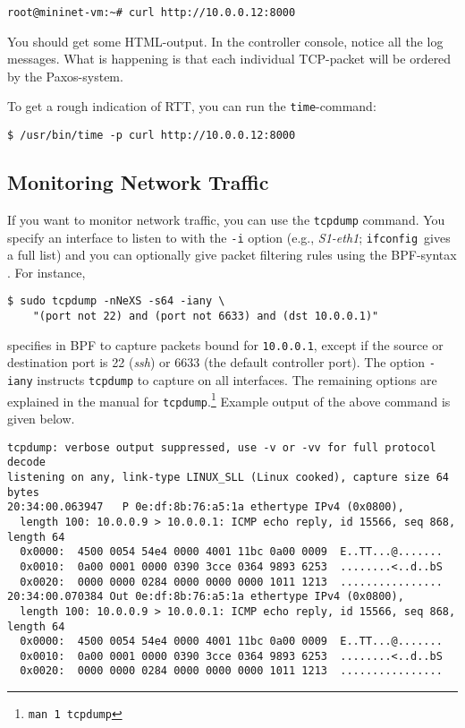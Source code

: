 \begin{Verbatim}
root@mininet-vm:~# curl http://10.0.0.12:8000
\end{Verbatim}

You should get some HTML-output.  In the controller console, notice
all the log messages.  What is happening is that each individual
\acs{TCP}-packet will be ordered by the Paxos-system.

To get a rough indication of \acf{RTT}, you can run the \texttt{time}-command:

\begin{Verbatim}
$ /usr/bin/time -p curl http://10.0.0.12:8000
\end{Verbatim}

\subsection{Monitoring Network Traffic}
\label{chapter:tcpdump}

If you want to monitor network traffic, you can use the
\texttt{tcpdump}
command.  You specify an interface to listen to with the
\texttt{-i} option (e.g., \textit{S1-eth1};
\texttt{ifconfig} gives a full list) and you can
optionally give packet filtering rules using the
\acf{BPF}-syntax \cite{McCanne:1993:BPF:1267303.1267305}.  For instance,

\begin{Verbatim}
$ sudo tcpdump -nNeXS -s64 -iany \
    "(port not 22) and (port not 6633) and (dst 10.0.0.1)"
\end{Verbatim}

specifies in \acs{BPF} to capture packets bound for \texttt{10.0.0.1},
except if the source or destination port is 22
(\textit{ssh}) or 6633\index{controller!traffic
monitoring} (the default
controller port).  The option \texttt{-iany} instructs \texttt{tcpdump} to
capture on all interfaces.  The remaining options are explained in the
manual for \texttt{tcpdump}.\footnote{\texttt{man 1 tcpdump}}
Example output of the above command is given below.

\begin{Verbatim}[fontsize=\footnotesize]
tcpdump: verbose output suppressed, use -v or -vv for full protocol decode
listening on any, link-type LINUX_SLL (Linux cooked), capture size 64 bytes
20:34:00.063947   P 0e:df:8b:76:a5:1a ethertype IPv4 (0x0800), 
  length 100: 10.0.0.9 > 10.0.0.1: ICMP echo reply, id 15566, seq 868, length 64
  0x0000:  4500 0054 54e4 0000 4001 11bc 0a00 0009  E..TT...@.......
  0x0010:  0a00 0001 0000 0390 3cce 0364 9893 6253  ........<..d..bS
  0x0020:  0000 0000 0284 0000 0000 0000 1011 1213  ................
20:34:00.070384 Out 0e:df:8b:76:a5:1a ethertype IPv4 (0x0800), 
  length 100: 10.0.0.9 > 10.0.0.1: ICMP echo reply, id 15566, seq 868, length 64
  0x0000:  4500 0054 54e4 0000 4001 11bc 0a00 0009  E..TT...@.......
  0x0010:  0a00 0001 0000 0390 3cce 0364 9893 6253  ........<..d..bS
  0x0020:  0000 0000 0284 0000 0000 0000 1011 1213  ................
\end{Verbatim}

